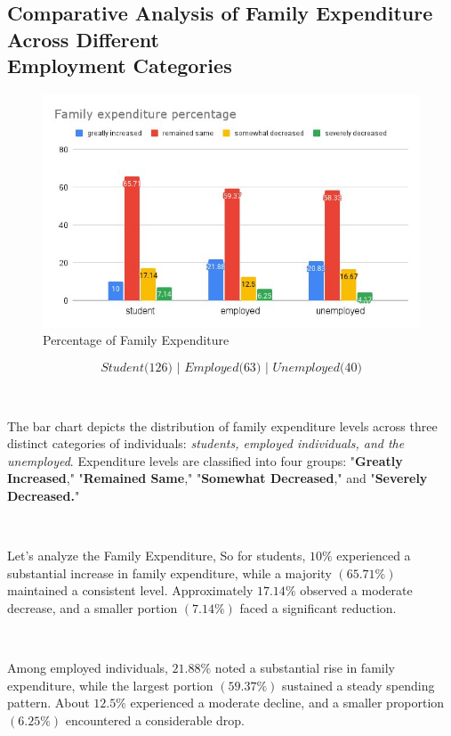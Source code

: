 \newpage

\subsection{Comparative Analysis of Family Expenditure Across Different\\ Employment Categories}

\begin{figure}[h!]
	\centering
	\includegraphics[width=0.9\linewidth]{IMAGES/Image 33.jpeg}
	\caption{Percentage of Family Expenditure}
	\label{G33}
\end{figure}
$$\textit{Student($126$) | Employed($63$) | Unemployed($40$)}$$

\ 

The bar chart depicts the distribution of family expenditure levels across three distinct categories of individuals: \textit{students, employed individuals, and the unemployed}. Expenditure levels are classified into four groups: "\textbf{Greatly Increased}," "\textbf{Remained Same}," "\textbf{Somewhat Decreased}," and "\textbf{Severely Decreased.}"

\ 

Let’s analyze the Family Expenditure, So for students, $10\%$ experienced a substantial increase in family expenditure, while a majority $(65.71\%)$ maintained a consistent level. Approximately $17.14\%$ observed a moderate decrease, and a smaller portion $(7.14\%)$ faced a significant reduction.

\

Among employed individuals, $21.88\%$ noted a substantial rise in family expenditure, while the largest portion $(59.37\%)$ sustained a steady spending pattern. About $12.5\%$ experienced a moderate decline, and a smaller proportion $(6.25\%)$ encountered a considerable drop.

